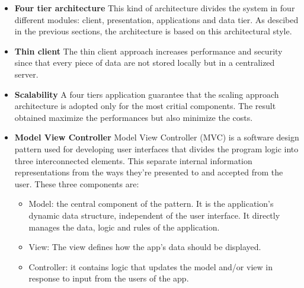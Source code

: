 \documentclass[table, 12pt]{article}
\begin{document}
    \begin{itemize}
        \item \textbf{Four tier architecture} \newline
              This kind of architecture divides the system in four different modules: client, presentation, applications and data tier.
              As descibed in the previous sections, the architecture is based on this architectural style.
        \item \textbf{Thin client} \newline
              The thin client approach increases performance and security since that every piece of data are not stored locally but in a centralized server.
        \item \textbf{Scalability} \newline
              A four tiers application guarantee that the scaling approach architecture is adopted only for the most critial components.
              The result obtained maximize the performances but also minimize the costs.
        \item \textbf{Model View Controller} \newline
              Model View Controller \cite{mvc} (MVC) is a software design pattern used for developing user interfaces that divides the program logic into three interconnected elements.
              This separate internal information representations from the ways they're presented to and accepted from the user.
              These three components are:
              \begin{itemize}
                  \item Model: the central component of the pattern. It is the application's dynamic data structure, independent of the user interface. It directly manages the data, logic and rules of the application.
                  \item View: The view defines how the app's data should be displayed.
                  \item Controller: it contains logic that updates the model and/or view in response to input from the users of the app. 
              \end{itemize}
    \end{itemize}

\newpage
\end{document}

